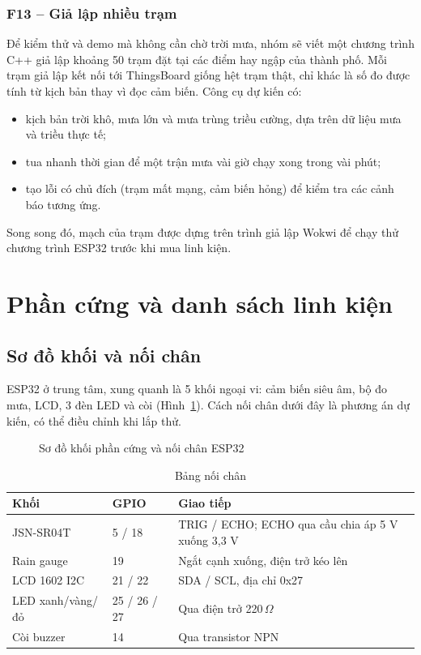 \documentclass[12pt,a4paper]{article}
\begin{document}
\subsubsection{F13 -- Giả lập nhiều trạm}\label{sec:f13}
Để kiểm thử và demo mà không cần chờ trời mưa, nhóm sẽ viết một chương trình C++ giả lập khoảng 50 trạm đặt tại các điểm hay ngập của thành phố. Mỗi trạm giả lập kết nối tới ThingsBoard giống hệt trạm thật, chỉ khác là số đo được tính từ kịch bản thay vì đọc cảm biến. Công cụ dự kiến có:
\begin{itemize}
  \item kịch bản trời khô, mưa lớn và mưa trùng triều cường, dựa trên dữ liệu mưa và triều thực tế;
  \item tua nhanh thời gian để một trận mưa vài giờ chạy xong trong vài phút;
  \item tạo lỗi có chủ đích (trạm mất mạng, cảm biến hỏng) để kiểm tra các cảnh báo tương ứng.
\end{itemize}
Song song đó, mạch của trạm được dựng trên trình giả lập Wokwi để chạy thử chương trình ESP32 trước khi mua linh kiện.

\section{Phần cứng và danh sách linh kiện}

\subsection{Sơ đồ khối và nối chân}

ESP32 ở trung tâm, xung quanh là 5 khối ngoại vi: cảm biến siêu âm, bộ đo mưa, LCD, 3 đèn LED và còi (Hình~\ref{fig:wiring}). Cách nối chân dưới đây là phương án dự kiến, có thể điều chỉnh khi lắp thử.

\begin{figure}[H]
\centering
\resizebox{\linewidth}{!}{\FigWiring}
\caption{Sơ đồ khối phần cứng và nối chân ESP32}
\label{fig:wiring}
\end{figure}

\begin{table}[H]
\centering
\caption{Bảng nối chân}
\renewcommand{\arraystretch}{1.3}
\begin{tabular}{|L{3.4cm}|C{2.6cm}|L{8cm}|}
\hline
{}\textbf{Khối} & \textbf{GPIO} & \textbf{Giao tiếp} \\ \hline
JSN-SR04T & 5 / 18 & TRIG / ECHO; ECHO qua cầu chia áp 5 V xuống 3,3 V \\ \hline
Rain gauge & 19 & Ngắt cạnh xuống, điện trở kéo lên \\ \hline
LCD 1602 I2C & 21 / 22 & SDA / SCL, địa chỉ 0x27 \\ \hline
LED xanh/vàng/đỏ & 25 / 26 / 27 & Qua điện trở 220\,$\Omega$ \\ \hline
Còi buzzer & 14 & Qua transistor NPN \\ \hline
\end{tabular}
\end{table}
\end{document}
